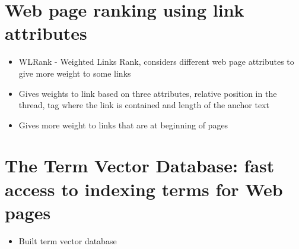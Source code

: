 \documentclass[11pt]{report}
\begin{document}
\section{Web page ranking using link attributes}
\begin{itemize}
\item WLRank - Weighted Links Rank, considers different web page attributes to give more weight to some links
\item Gives weights to link based on three attributes, relative position in the thread, tag where the link is contained and length of the anchor text
\item Gives more weight to links that are at beginning of pages
\end{itemize}
\section{The Term Vector Database: fast access to indexing terms for Web pages}
\begin{itemize}
\item Built term vector database
\end{itemize}
\end{document}
